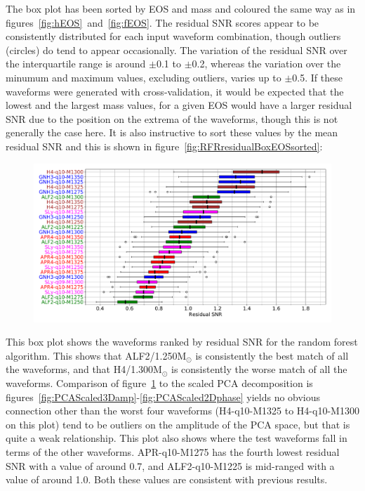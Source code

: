 The box plot has been sorted by EOS and mass and coloured the same way as in figures~\ref{fig:hEOS}~and~\ref{fig:fEOS}. The residual SNR scores appear to be consistently distributed for each input waveform combination, though outliers (circles) do tend to appear occasionally. The variation of the residual SNR over the interquartile range is around $\pm$0.1 to $\pm$0.2, whereas the variation over the minumum and maximum values, excluding outliers, varies up to $\pm$0.5. If these waveforms were generated with cross-validation, it would be expected that the lowest and the largest mass values, for a given EOS would have a larger residual SNR due to the position on the extrema of the waveforms, though this is not generally the case here. It is also instructive to sort these values by the mean residual SNR and this is shown in figure~\ref{fig:RFRresidualBoxEOSsorted}:
\begin{figure}[H]
	\centering
	\includegraphics[width=15cm]{./img/RFRresidualBoxMeansorted.pdf} 
	\caption[\protect]{\protect}
	\label{fig:RFRresidualBoxMeansorted}
\end{figure}
This box plot shows the waveforms ranked by residual SNR for the random forest algorithm. This shows that ALF2/1.250M$_\odot$ is consistently the best match of all the waveforms, and that H4/1.300M$_\odot$ is consistently the worse match of all the waveforms. Comparison of figure~\ref{fig:RFRresidualBoxMeansorted} to the scaled PCA decomposition is figures~\ref{fig:PCAScaled3Damp}-\ref{fig:PCAScaled2Dphase} yields no obvious connection other than the worst four waveforms (H4-q10-M1325 to H4-q10-M1300 on this plot) tend to be outliers on the amplitude of the PCA space, but that is quite a weak relationship. This plot also shows where the test waveforms fall in terms of the other waveforms. APR-q10-M1275 has the fourth lowest residual SNR with  a value of around 0.7, and ALF2-q10-M1225 is mid-ranged with a value of around 1.0. Both these values are consistent with previous results.\par 

